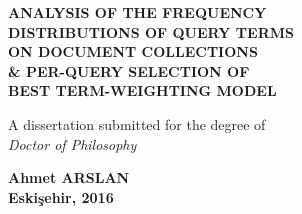 %
%
%





\makeatother

\thispagestyle{empty}



\begin{spacing}{1.0}
\vspace*{12.3cm}
\begin{center}

{\footnotesize

\textbf{ANALYSIS OF THE FREQUENCY \\ DISTRIBUTIONS OF QUERY TERMS \\ ON DOCUMENT COLLECTIONS \\ \& PER-QUERY SELECTION OF \\ BEST TERM-WEIGHTING MODEL}


A dissertation submitted for the degree of \\ \emph{Doctor of Philosophy}

\vspace{0.2cm}

\textbf{Ahmet ARSLAN \\ Eski\c{s}ehir, 2016}

}
\end{center}
\end{spacing} 

 